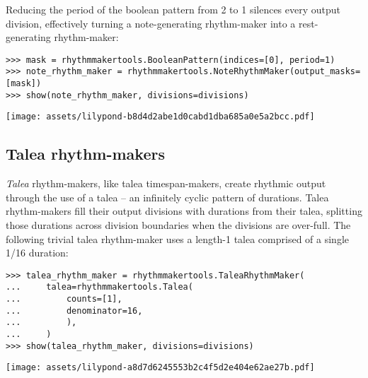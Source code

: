 \noindent Reducing the period of the boolean pattern from 2 to 1 silences every
output division, effectively turning a note-generating rhythm-maker into a
rest-generating rhythm-maker:

\begin{comment}
<abjad>
mask = rhythmmakertools.BooleanPattern(indices=[0], period=1)
note_rhythm_maker = rhythmmakertools.NoteRhythmMaker(output_masks=[mask])
show(note_rhythm_maker, divisions=divisions)
</abjad>
\end{comment}

\begin{abjadbookoutput}
\begin{singlespacing}
\vspace{-0.5\baselineskip}
\begin{lstlisting}
>>> mask = rhythmmakertools.BooleanPattern(indices=[0], period=1)
>>> note_rhythm_maker = rhythmmakertools.NoteRhythmMaker(output_masks=[mask])
>>> show(note_rhythm_maker, divisions=divisions)
\end{lstlisting}
\noindent\texttt{[image: assets/lilypond-b8d4d2abe1d0cabd1dba685a0e5a2bcc.pdf]}
\end{singlespacing}
\end{abjadbookoutput}

\subsection{Talea rhythm-makers}

\emph{Talea} rhythm-makers, like talea timespan-makers, create rhythmic output through
the use of a talea -- an infinitely cyclic pattern of durations. Talea
rhythm-makers fill their output divisions with durations from their talea,
splitting those durations across division boundaries when the divisions are
over-full. The following trivial talea rhythm-maker uses a length-1 talea
comprised of a single 1/16 duration:

\begin{comment}
<abjad>
talea_rhythm_maker = rhythmmakertools.TaleaRhythmMaker(
    talea=rhythmmakertools.Talea(
        counts=[1],
        denominator=16,
        ),
    )
show(talea_rhythm_maker, divisions=divisions)
</abjad>
\end{comment}

\begin{abjadbookoutput}
\begin{singlespacing}
\vspace{-0.5\baselineskip}
\begin{lstlisting}
>>> talea_rhythm_maker = rhythmmakertools.TaleaRhythmMaker(
...     talea=rhythmmakertools.Talea(
...         counts=[1],
...         denominator=16,
...         ),
...     )
>>> show(talea_rhythm_maker, divisions=divisions)
\end{lstlisting}
\noindent\texttt{[image: assets/lilypond-a8d7d6245553b2c4f5d2e404e62ae27b.pdf]}
\end{singlespacing}
\end{abjadbookoutput}

